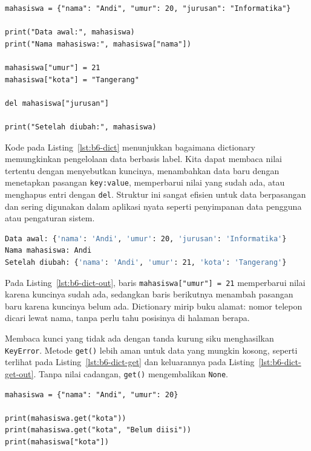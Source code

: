 \begin{lstlisting}[style=PythonStyle, caption={Membaca dan mengubah isi dictionary}, label={lst:b6-dict}]
mahasiswa = {"nama": "Andi", "umur": 20, "jurusan": "Informatika"}

print("Data awal:", mahasiswa)
print("Nama mahasiswa:", mahasiswa["nama"])

mahasiswa["umur"] = 21
mahasiswa["kota"] = "Tangerang"

del mahasiswa["jurusan"]

print("Setelah diubah:", mahasiswa)
\end{lstlisting}

Kode pada Listing~\ref{lst:b6-dict} menunjukkan bagaimana dictionary memungkinkan pengelolaan data berbasis label. 
Kita dapat membaca nilai tertentu dengan menyebutkan kuncinya, 
menambahkan data baru dengan menetapkan pasangan \texttt{key:value}, 
memperbarui nilai yang sudah ada, atau menghapus entri dengan \texttt{del}. 
Struktur ini sangat efisien untuk data berpasangan dan sering digunakan dalam aplikasi nyata seperti penyimpanan data pengguna atau pengaturan sistem.

\begin{lstlisting}[language=bash, caption={Keluaran kode pengubahan dictionary}, label={lst:b6-dict-out}]
Data awal: {'nama': 'Andi', 'umur': 20, 'jurusan': 'Informatika'}
Nama mahasiswa: Andi
Setelah diubah: {'nama': 'Andi', 'umur': 21, 'kota': 'Tangerang'}
\end{lstlisting}

Pada Listing~\ref{lst:b6-dict-out}, baris \texttt{mahasiswa["umur"] = 21} memperbarui nilai karena kuncinya sudah ada, sedangkan baris berikutnya menambah pasangan baru karena kuncinya belum ada. Dictionary mirip buku alamat: nomor telepon dicari lewat nama, tanpa perlu tahu posisinya di halaman berapa.

Membaca kunci yang tidak ada dengan tanda kurung siku menghasilkan \texttt{KeyError}. Metode \texttt{get()} lebih aman untuk data yang mungkin kosong, seperti terlihat pada Listing~\ref{lst:b6-dict-get} dan keluarannya pada Listing~\ref{lst:b6-dict-get-out}. Tanpa nilai cadangan, \texttt{get()} mengembalikan \texttt{None}.

\begin{lstlisting}[style=PythonStyle, caption={Kode Python: dictionary_get.py}, label={lst:b6-dict-get}]
mahasiswa = {"nama": "Andi", "umur": 20}

print(mahasiswa.get("kota"))
print(mahasiswa.get("kota", "Belum diisi"))
print(mahasiswa["kota"])
\end{lstlisting}

